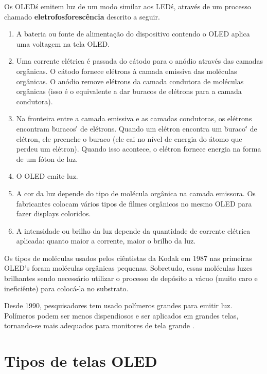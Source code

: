 Os OLED\'s emitem luz de um modo similar aos LED\'s, através de um processo chamado {\bf eletrofosforescência} descrito a seguir. 

\begin{enumerate}

	\item A bateria ou fonte de alimentação do dispositivo contendo o OLED aplica uma voltagem na tela OLED. 

	\item Uma corrente elétrica é passada do cátodo para o anódio através das camadas orgânicas. O cátodo fornece elétrons à camada emissiva das moléculas orgânicas. O anódio remove elétrons da camada condutora de moléculas orgânicas (isso é o equivalente a dar buracos de elétrons para a camada condutora).

	\item Na fronteira entre a camada emissiva e as camadas condutoras, os elétrons encontram \"buracos\'' de elétrons. Quando um elétron encontra um \"buraco\'' de elétron, ele preenche o buraco (ele cai no nível de energia do átomo que perdeu um elétron). Quando isso acontece, o elétron fornece energia na forma de um fóton de luz. 

	\item O OLED emite luz. 

	\item A cor da luz depende do tipo de molécula orgânica na camada emissora. Os fabricantes colocam vários tipos de filmes orgânicos no mesmo OLED para fazer displays coloridos.

	\item A intensidade ou brilho da luz depende da quantidade de corrente elétrica aplicada: quanto maior a corrente, maior o brilho da luz.
\end{enumerate}

Os tipos de moléculas usados pelos ciêntistas da Kodak em 1987 nas primeiras OLED's foram moléculas orgânicas pequenas. Sobretudo, essas moléculas luzes brilhantes sendo necessário utilizar o processo de depósito a vácuo (muito caro e ineficiênte) para colocá-la no substrato. 

Desde 1990, pesquisadores tem usado polímeros grandes para emitir luz. Polímeros podem ser menos dispendiosos e ser aplicados em grandes telas, tornando-se mais adequados para monitores de tela grande \cite{HSWOLED}.


\section{Tipos de telas OLED}
\label{sec:tipos}

